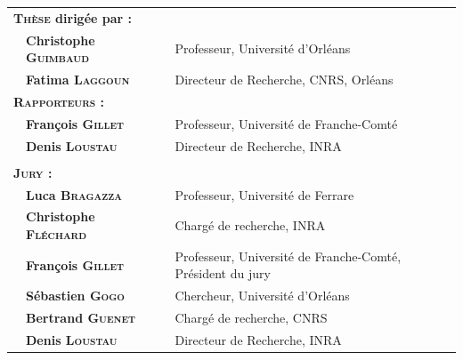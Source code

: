 \begin{center}
\begin{tabular}{l l l l}
\multicolumn{2}{l}{\textbf{\textsc{Thèse} dirig\'ee par : }} & & \\[.5ex]
	& \textbf{Christophe \textsc{Guimbaud}} &  &  Professeur, Université d'Orléans\\
	& \textbf{Fatima \textsc{Laggoun}} & &  Directeur de Recherche, CNRS, Orléans\\[1ex]
\multicolumn{2}{l}{\textsc{\textbf{Rapporteurs :}}} & & \\[.5ex]
	& \textbf{François \textsc{Gillet}} & &  Professeur, Université de Franche-Comté\\
	& \textbf{Denis \textsc{Loustau}} & &  Directeur de Recherche, INRA\\[1ex]
\hline\\ [-1ex]
\multicolumn{2}{l}{\textsc{\textbf{Jury : }}} & &\\[.5ex]
	&\textbf{Luca \textsc{Bragazza}} &  & Professeur, Université de Ferrare\\
	&\textbf{Christophe \textsc{Fléchard}} &  &  Chargé de recherche, INRA\\
	&\textbf{François \textsc{Gillet}} & &  Professeur, Université de Franche-Comté, Pr\'esident du jury\\
	&\textbf{Sébastien \textsc{Gogo}} &  &  Chercheur, Université d'Orléans\\
	&\textbf{Bertrand \textsc{Guenet}} &  &  Chargé de recherche, CNRS\\
	&\textbf{Denis \textsc{Loustau}} & &  Directeur de Recherche, INRA\\
\end{tabular}
\end{center}

\vfill

\restoregeometry %
